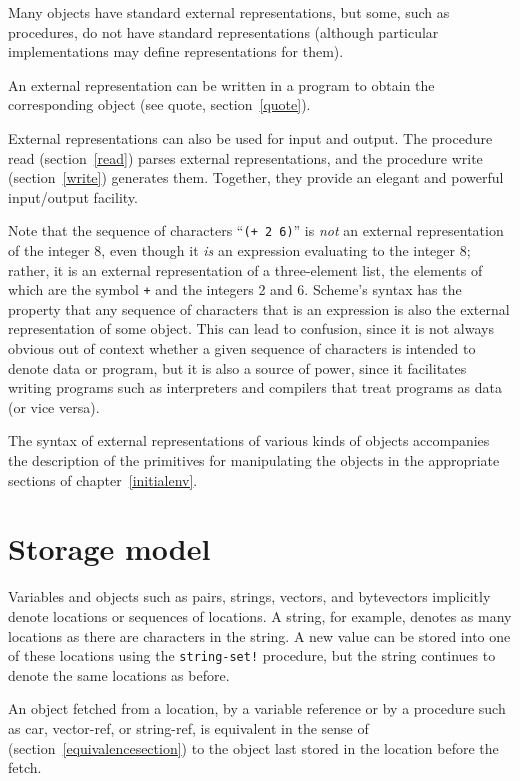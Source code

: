 Many objects have standard external representations, but some, such as
procedures, do not have standard representations (although particular
implementations may define representations for them).

An external representation can be written in a program to obtain the
corresponding object (see {\cf quote}, section~\ref{quote}).

External representations can also be used for input and output.  The
procedure {\cf read} (section~\ref{read}) parses external
representations, and the procedure {\cf write} (section~\ref{write})
generates them.  Together, they provide an elegant and powerful
input/output facility.

Note that the sequence of characters ``{\tt(+ 2 6)}'' is {\em not} an
external representation of the integer 8, even though it {\em is} an
expression evaluating to the integer 8; rather, it is an external
representation of a three-element list, the elements of which are the symbol
{\tt +} and the integers 2 and 6.  Scheme's syntax has the property that
any sequence of characters that is an expression is also the external
representation of some object.  This can lead to confusion, since it is not always
obvious out of context whether a given sequence of characters is
intended to denote data or program, but it is also a source of power,
since it facilitates writing programs such as interpreters and
compilers that treat programs as data (or vice versa).

The syntax of external representations of various kinds of objects
accompanies the description of the primitives for manipulating the
objects in the appropriate sections of chapter~\ref{initialenv}.

\section{Storage model}
\label{storagemodel}

Variables and objects such as pairs, strings, vectors, and bytevectors implicitly
denote locations or sequences of locations.  A string, for
example, denotes as many locations as there are characters in the string. 
A new value can be
stored into one of these locations using the {\tt string-set!} procedure, but
the string continues to denote the same locations as before.

An object fetched from a location, by a variable reference or by
a procedure such as {\cf car}, {\cf vector-ref}, or {\cf string-ref}, is
equivalent in the sense of 
(section~\ref{equivalencesection})
to the object last stored in the location before the fetch.

